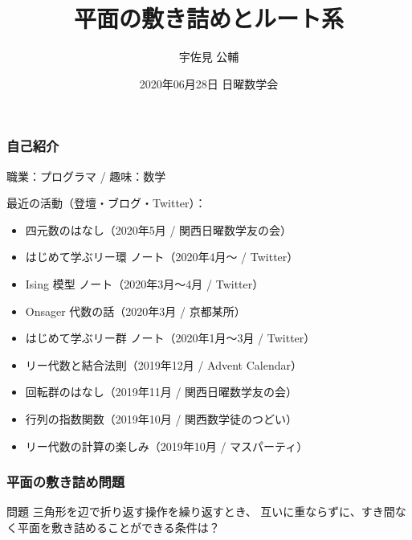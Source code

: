 \documentclass{beamer}
\title{平面の敷き詰めとルート系}
\author{宇佐見 公輔}
\date{2020年06月28日 日曜数学会}
\begin{document}
\maketitle

\begin{frame}
    \frametitle{自己紹介}

    職業：プログラマ / 趣味：数学

    \bigskip

    最近の活動（登壇・ブログ・Twitter）：
    \begin{itemize}
        \item 四元数のはなし（2020年5月 / 関西日曜数学友の会）
        \item はじめて学ぶリー環 ノート（2020年4月〜 / Twitter）
        \item Ising 模型 ノート（2020年3月〜4月 / Twitter）
        \item Onsager 代数の話（2020年3月 / 京都某所）
        \item はじめて学ぶリー群 ノート（2020年1月〜3月 / Twitter）
        \item リー代数と結合法則（2019年12月 / Advent Calendar）
        \item 回転群のはなし（2019年11月 / 関西日曜数学友の会）
        \item 行列の指数関数（2019年10月 / 関西数学徒のつどい）
        \item リー代数の計算の楽しみ（2019年10月 / マスパーティ）
    \end{itemize}
\end{frame}

\begin{frame}
    \frametitle{平面の敷き詰め問題}

    \begin{block}{問題}
        三角形を辺で折り返す操作を繰り返すとき、
        互いに重ならずに、すき間なく平面を敷き詰めることができる条件は？
    \end{block}

\end{frame}
\end{document}
